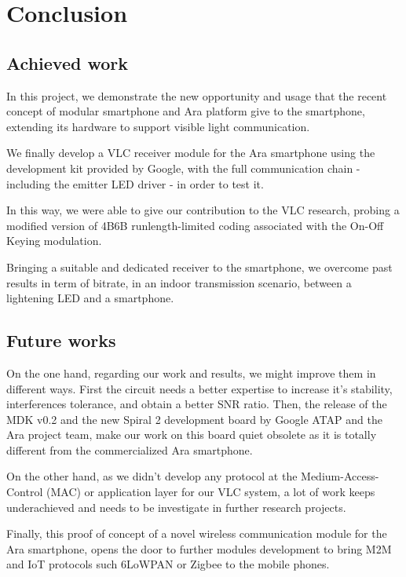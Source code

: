 
\chapter{Conclusion}

\label{Conclusion}



\section{Achieved work}

In this project, we demonstrate the new opportunity and usage that the recent concept of modular smartphone and Ara platform give to the smartphone, extending its hardware to support visible light communication.

We finally develop a VLC receiver module for the Ara smartphone using the development kit provided by Google, with the full communication chain - including the emitter LED driver - in order to test it.

In this way, we were able to give our contribution to the VLC research, probing a modified version of 4B6B runlength-limited coding associated with the On-Off Keying modulation.

Bringing a suitable and dedicated receiver to the smartphone, we overcome past results in term of bitrate, in an indoor transmission scenario, between a lightening LED and a smartphone.



\section{Future works}

On the one hand, regarding our work and results, we might improve them in different ways. First the circuit needs a better expertise to increase it's stability, interferences tolerance, and obtain a better SNR ratio.
Then, the release of the MDK v0.2 and the new Spiral 2 development board by Google ATAP and the Ara project team, make our work on this board quiet obsolete as it is totally different from the commercialized Ara smartphone.

On the other hand, as we didn't develop any protocol at the Medium-Access-Control (MAC) or application layer for our VLC system, a lot of work keeps underachieved and needs to be investigate in further research projects.

Finally, this proof of concept of a novel wireless communication module for the Ara smartphone, opens the door to further modules development to bring  M2M and IoT protocols such 6LoWPAN or Zigbee to the mobile phones.